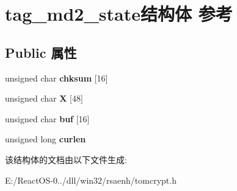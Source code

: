 \hypertarget{structtag__md2__state}{}\section{tag\+\_\+md2\+\_\+state结构体 参考}
\label{structtag__md2__state}
\subsection*{Public 属性}
\begin{DoxyCompactItemize}
\item 
\mbox{\label{structtag__md2__state_a3298ef0fb6287e175d5ba11293942dc6}} 
unsigned char {\bfseries chksum} \mbox{[}16\mbox{]}
\item 
\mbox{\label{structtag__md2__state_a83d306bca8fd639ee0ee018e7726f6b2}} 
unsigned char {\bfseries X} \mbox{[}48\mbox{]}
\item 
\mbox{\label{structtag__md2__state_a6a92fc9f80b60121574c5a346bd447ca}} 
unsigned char {\bfseries buf} \mbox{[}16\mbox{]}
\item 
\mbox{\label{structtag__md2__state_ad9d249545146be4037ca16d2c0834eb0}} 
unsigned long {\bfseries curlen}
\end{DoxyCompactItemize}


该结构体的文档由以下文件生成\+:\begin{DoxyCompactItemize}
\item 
E\+:/\+React\+O\+S-\/0../dll/win32/rsaenh/tomcrypt.\+h\end{DoxyCompactItemize}

